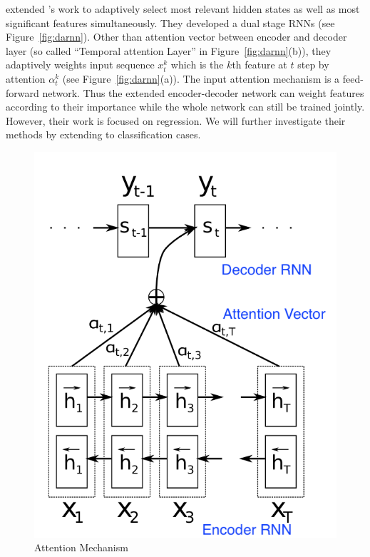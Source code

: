 \documentclass{article} \usepackage{tabularx}
\renewcommand{\citename}{\citet} \renewcommand{\cite}{\citep}
\begin{document}
\citename{qin2017dual} extended \citename{attention}'s work to
adaptively select most relevant hidden states as well as most
significant features simultaneously. They developed a dual stage
RNNs (see Figure~\ref{fig:darnn}). Other than attention vector
between encoder and decoder layer (so called ``Temporal attention
Layer'' in Figure~\ref{fig:darnn}(b)), they adaptively weights
input sequence $x_t^k$ which is the $k$th feature at $t$ step by
attention $\alpha_t^k$ (see Figure~\ref{fig:darnn}(a)). The input
attention mechanism is a feed-forward network. Thus the extended
encoder-decoder network can weight features according to their
importance while the whole network can still be trained jointly.
However, their work is focused on regression. We will further
investigate their methods by extending to classification cases.

\begin{figure}
  \centering
  \includegraphics[scale=0.5]{images/attention.png}
  \caption{Attention Mechanism}
  \label{fig:attention}
\end{figure}
\end{document}
